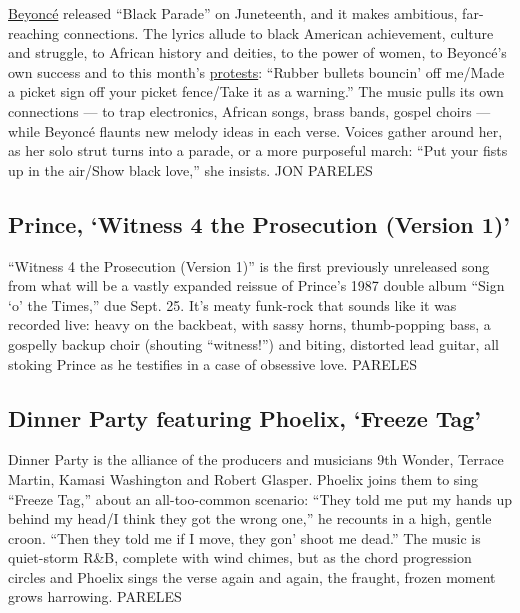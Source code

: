 \href{https://www.nytimes.com/2020/07/31/arts/music/beyonce-black-is-king.html}{Beyoncé}
released ``Black Parade'' on Juneteenth, and it makes ambitious,
far-reaching connections. The lyrics allude to black American
achievement, culture and struggle, to African history and deities, to
the power of women, to Beyoncé's own success and to this month's
\href{https://www.nytimes.com/news-event/george-floyd-protests-minneapolis-new-york-los-angeles}{protests}:
``Rubber bullets bouncin' off me/Made a picket sign off your picket
fence/Take it as a warning.'' The music pulls its own connections --- to
trap electronics, African songs, brass bands, gospel choirs --- while
Beyoncé flaunts new melody ideas in each verse. Voices gather around
her, as her solo strut turns into a parade, or a more purposeful march:
``Put your fists up in the air/Show black love,'' she insists. JON
PARELES

\hypertarget{prince-witness-4-the-prosecution-version-1}{%
\subsection{Prince, `Witness 4 the Prosecution (Version
1)'}\label{prince-witness-4-the-prosecution-version-1}}

``Witness 4 the Prosecution (Version 1)'' is the first previously
unreleased song from what will be a vastly expanded reissue of Prince's
1987 double album ``Sign `o' the Times,'' due Sept. 25. It's meaty
funk-rock that sounds like it was recorded live: heavy on the backbeat,
with sassy horns, thumb-popping bass, a gospelly backup choir (shouting
``witness!'') and biting, distorted lead guitar, all stoking Prince as
he testifies in a case of obsessive love. PARELES

\hypertarget{dinner-party-featuring-phoelix-freeze-tag}{%
\subsection{Dinner Party featuring Phoelix, `Freeze
Tag'}\label{dinner-party-featuring-phoelix-freeze-tag}}

Dinner Party is the alliance of the producers and musicians 9th Wonder,
Terrace Martin, Kamasi Washington and Robert Glasper. Phoelix joins them
to sing ``Freeze Tag,'' about an all-too-common scenario: ``They told me
put my hands up behind my head/I think they got the wrong one,'' he
recounts in a high, gentle croon. ``Then they told me if I move, they
gon' shoot me dead.'' The music is quiet-storm R\&B, complete with wind
chimes, but as the chord progression circles and Phoelix sings the verse
again and again, the fraught, frozen moment grows harrowing. PARELES

